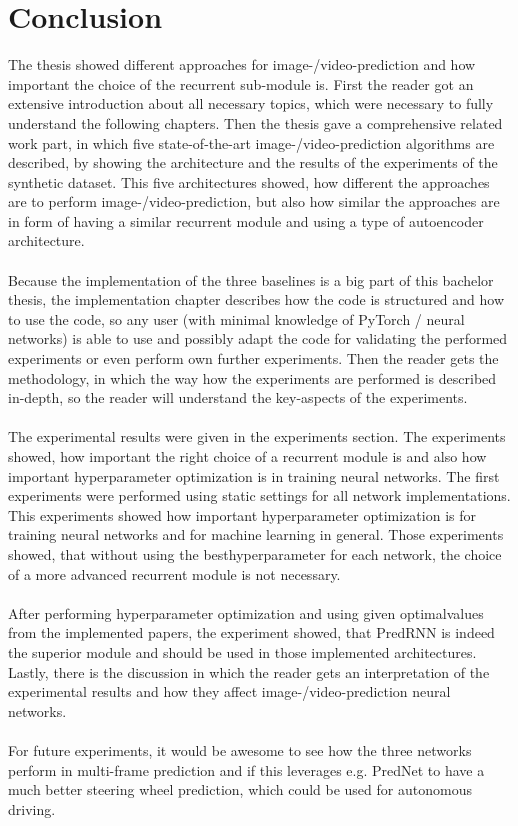 \section{Conclusion} \label{section::conclusion}
 The thesis showed different approaches for image-/video-prediction and how important the choice of the recurrent sub-module is.
 First the reader got an extensive introduction
 about all necessary topics, which were necessary to fully understand the following chapters. Then the thesis gave a comprehensive related work part, in which
 five state-of-the-art image-/video-prediction algorithms are described, by showing the architecture and the results of the experiments of the synthetic dataset.
 This five architectures showed, how different the approaches are to perform image-/video-prediction, but also how similar the approaches are in form of
 having a similar recurrent module and using a type of autoencoder architecture.
 \\\\
 Because the implementation
 of the three baselines is a big part of this bachelor thesis, the implementation chapter describes how the code is structured and how to use the code, so any
 user (with minimal knowledge of PyTorch / neural networks) is able to use and possibly adapt the code for validating the performed experiments or even perform
 own further experiments. Then the reader gets the methodology, in which the way how the experiments are performed is described in-depth, so the reader will 
 understand the key-aspects of the experiments.
 \\\\
 The experimental results were given in the experiments section.
 The experiments showed, how important the right choice of a recurrent module is and also how important hyperparameter optimization is in training neural networks.
 The first experiments were performed using static settings for all network implementations. This experiments showed how important hyperparameter optimization
 is for training neural networks and for machine learning in general. Those experiments showed, that without using the \glqq best\grqq hyperparameter for each
 network, the choice of a more advanced recurrent module is not necessary.
 \\\\ 
 After performing hyperparameter optimization and using given \glqq optimal\grqq values 
 from the implemented papers, the experiment showed, that
 PredRNN is indeed the superior module and should be used in those implemented architectures. 
 Lastly, there is the discussion in which
 the reader gets an interpretation of the experimental results and how they affect image-/video-prediction neural networks.
 \\\\
 For future experiments, it would be awesome to see how the three networks perform in multi-frame prediction and if this leverages e.g. PredNet to have a much
 better steering wheel prediction, which could be used for autonomous driving.